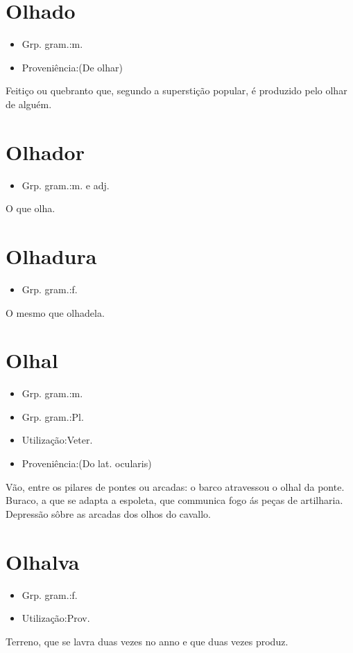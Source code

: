 \section{Olhado}
\begin{itemize}
\item {Grp. gram.:m.}
\end{itemize}
\begin{itemize}
\item {Proveniência:(De \textunderscore olhar\textunderscore )}
\end{itemize}
Feitiço ou quebranto que, segundo a superstição popular, é produzido pelo olhar de alguém.
\section{Olhador}
\begin{itemize}
\item {Grp. gram.:m.  e  adj.}
\end{itemize}
O que olha.
\section{Olhadura}
\begin{itemize}
\item {Grp. gram.:f.}
\end{itemize}
O mesmo que \textunderscore olhadela\textunderscore .
\section{Olhal}
\begin{itemize}
\item {Grp. gram.:m.}
\end{itemize}
\begin{itemize}
\item {Grp. gram.:Pl.}
\end{itemize}
\begin{itemize}
\item {Utilização:Veter.}
\end{itemize}
\begin{itemize}
\item {Proveniência:(Do lat. \textunderscore ocularis\textunderscore )}
\end{itemize}
Vão, entre os pilares de pontes ou arcadas: \textunderscore o barco atravessou o olhal da ponte\textunderscore .
Buraco, a que se adapta a espoleta, que communica fogo ás peças de artilharia.
Depressão sôbre as arcadas dos olhos do cavallo.
\section{Olhalva}
\begin{itemize}
\item {Grp. gram.:f.}
\end{itemize}
\begin{itemize}
\item {Utilização:Prov.}
\end{itemize}
Terreno, que se lavra duas vezes no anno e que duas vezes produz.
